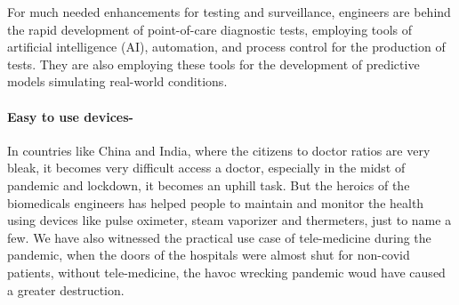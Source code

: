 \documentclass[a4paper,12pt]{extarticle}
\begin{document}
For much needed enhancements for testing and surveillance, engineers are behind the rapid development of point-of-care diagnostic tests, employing tools of artificial intelligence (AI), automation, and process control for the production of tests. They are also employing these tools for the development of predictive models simulating real-world conditions.

\paragraph{Easy to use devices-} In countries like China and India, where the citizens to doctor ratios are very bleak, it becomes very difficult access a doctor, especially in the midst of pandemic and lockdown, it becomes an uphill task. But the heroics of the biomedicals engineers has helped people to maintain and monitor the health using devices like pulse oximeter, steam vaporizer and thermeters, just to name a few. We have also witnessed the practical use case of tele-medicine during the pandemic, when the doors of the hospitals were almost shut for non-covid patients, without tele-medicine, the havoc wrecking pandemic woud have caused a greater destruction.
\end{document}
